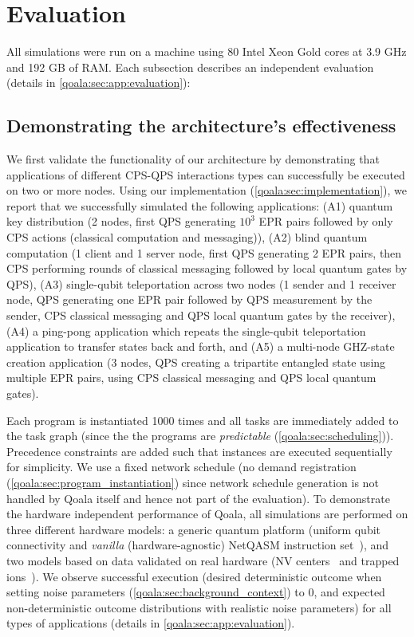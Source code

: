 \section{Evaluation}
\label{qoala:sec:evaluation}
All simulations were run on a machine using 80 Intel Xeon Gold cores at 3.9 GHz and 192 GB of RAM.
Each subsection describes an independent evaluation (details in \cref{qoala:sec:app:evaluation}):

\subsection{Demonstrating the architecture's effectiveness}
\label{qoala:sec:demonstrating_architecture_effectiveness}
We first validate the functionality of our architecture by demonstrating that applications of different CPS-QPS interactions types can successfully be executed on two or more nodes.
Using our implementation (\cref{qoala:sec:implementation}), we report that we successfully simulated the following applications:
(A1) quantum key distribution (2 nodes, first QPS generating $10^3$ EPR pairs followed by only CPS actions (classical computation and messaging)),
(A2) blind quantum computation (1 client and 1 server node, first QPS generating 2 EPR pairs, then CPS performing rounds of classical messaging followed by local quantum gates by QPS),
(A3) single-qubit teleportation across two nodes (1 sender and 1 receiver node, QPS generating one EPR pair followed by QPS measurement by the sender, CPS classical messaging and QPS local quantum gates by the receiver),
(A4) a ping-pong application which repeats the single-qubit teleportation application to transfer states back and forth,
and (A5) a multi-node GHZ-state~\cite{greenberger1989going} creation application (3 nodes, QPS creating a tripartite entangled state using multiple EPR pairs, using CPS classical messaging and QPS local quantum gates).

Each program is instantiated 1000 times and all tasks are immediately added to the task graph (since the the programs are \textit{predictable} (\cref{qoala:sec:scheduling})).
Precedence constraints are added such that instances are executed sequentially for simplicity.
We use a fixed network schedule (no demand registration (\cref{qoala:sec:program_instantiation}) since network schedule generation is not handled by Qoala itself and hence not part of the evaluation).
To demonstrate the hardware independent performance of Qoala, all simulations are performed on three different hardware models: a generic quantum platform (uniform qubit connectivity and \textit{vanilla} (hardware-agnostic) NetQASM instruction set~\cite{dahlberg2022netqasm}),
and two models based on data validated on real hardware (NV centers~\cite{bradley2019ten, hermans2022qubit} and trapped ions~\cite{krutyanskiy2023entanglement}). 
We observe successful execution (desired deterministic outcome when setting noise parameters (\cref{qoala:sec:background_context}) to 0, and expected non-deterministic outcome distributions with realistic noise parameters) for all types of applications (details in \cref{qoala:sec:app:evaluation}).


